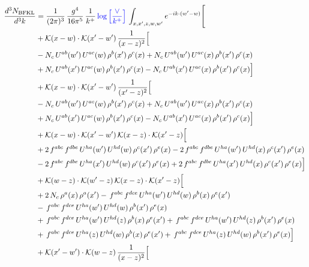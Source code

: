 \documentclass[10pt]{article}
\numberwithin{equation}{section}
\newcommand{\new}[1]{{\color{blue}#1}}
\begin{document}
\begin{align}
\frac{d^{3}N_{\mathrm{BFKL}}}{d^{3}k} & = \frac{1}{(2\pi)^{3}}\,\frac{g^{4}}{16\pi^{5}}\,\frac{1}{k^{+}}\,\new{\log\Big[\frac{\vee}{k^{+}}\Big]}\,\int_{x,x',z,w,w'}e^{-ik\cdot(w'-w)}\Bigg[ \notag\\
& +\mathcal{K}(x-w)\cdot\mathcal{K}(x'-w')\,\frac{1}{(x-z)^{2}}\Big[\notag\\
& -N_{c}\,U^{ab}(w')\,U^{ac}(w)\,\rho^{b}(x')\,\rho^{c}(x) +N_{c}\,U^{ab}(w')\,U^{ac}(x)\,\rho^{b}(x')\,\rho^{c}(x)\notag\\
& +N_{c}\,U^{ab}(x')\,U^{ac}(w)\,\rho^{b}(x')\,\rho^{c}(x) -N_{c}\,U^{ab}(x')\,U^{ac}(x)\,\rho^{b}(x')\,\rho^{c}(x)\Big]\notag\\
& +\mathcal{K}(x-w)\cdot\mathcal{K}(x'-w')\,\frac{1}{(x'-z)^{2}}\Big[\notag\\
& -N_{c}\,U^{ab}(w')\,U^{ac}(w)\,\rho^{b}(x')\,\rho^{c}(x) +N_{c}\,U^{ab}(w')\,U^{ac}(x)\,\rho^{b}(x')\,\rho^{c}(x)\notag\\
& +N_{c}\,U^{ab}(x')\,U^{ac}(w)\,\rho^{b}(x')\,\rho^{c}(x) -N_{c}\,U^{ab}(x')\,U^{ac}(x)\,\rho^{b}(x')\,\rho^{c}(x)\Big]\notag\\
& +\mathcal{K}(x-w)\cdot\mathcal{K}(x'-w')\,\mathcal{K}(x-z)\cdot\mathcal{K}(x'-z)\Big[\notag\\
& +2\,f^{abc}\,f^{dbe}\,U^{ha}(w')\,U^{hd}(w)\,\rho^{c}(x')\,\rho^{e}(x) -2\,f^{abc}\,f^{dbe}\,U^{ha}(w')\,U^{hd}(x)\,\rho^{c}(x')\,\rho^{e}(x)\notag\\
& -2\,f^{abc}\,f^{dbe}\,U^{ha}(x')\,U^{hd}(w)\,\rho^{c}(x')\,\rho^{e}(x) +2\,f^{abc}\,f^{dbe}\,U^{ha}(x')\,U^{hd}(x)\,\rho^{c}(x')\,\rho^{e}(x)\Big]\notag\\
& +\mathcal{K}(w-z)\cdot\mathcal{K}(w'-z)\,\mathcal{K}(x-z)\cdot\mathcal{K}(x'-z)\Big[\notag\\
& +2\,N_{c}\,\rho^{a}(x)\,\rho^{a}(x') -\,f^{abc}\,f^{dce}\,U^{ha}(w')\,U^{hd}(w)\,\rho^{b}(x)\,\rho^{e}(x')\notag\\
& -\,f^{abc}\,f^{dce}\,U^{ha}(w')\,U^{hd}(w)\,\rho^{b}(x')\,\rho^{e}(x)\notag\\
& +\,f^{abc}\,f^{dce}\,U^{ha}(w')\,U^{hd}(z)\,\rho^{b}(x)\,\rho^{e}(x') +\,f^{abc}\,f^{dce}\,U^{ha}(w')\,U^{hd}(z)\,\rho^{b}(x')\,\rho^{e}(x)\notag\\
& +\,f^{abc}\,f^{dce}\,U^{ha}(z)\,U^{hd}(w)\,\rho^{b}(x)\,\rho^{e}(x') +\,f^{abc}\,f^{dce}\,U^{ha}(z)\,U^{hd}(w)\,\rho^{b}(x')\,\rho^{e}(x)\Big]\notag\\
& +\mathcal{K}(x'-w')\cdot\mathcal{K}(w-z)\,\frac{1}{(x-z)^{2}}\Big[\notag\\

\end{align}
\end{document}
